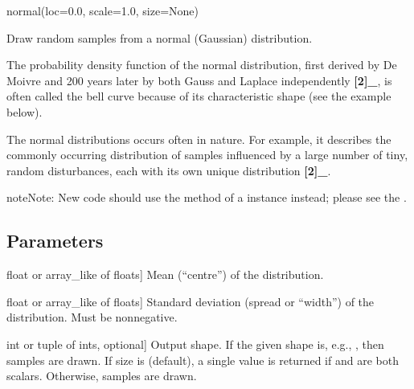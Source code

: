 \documentclass[letterpaper,10pt,english]{sphinxmanual}
\begin{document}
\begin{fulllineitems}
\label{\detokenize{myfpga:myfpga.ring_osc.np_normal}}
\pysigstartsignatures
{}
\pysigstopsignatures
\sphinxAtStartPar
normal(loc=0.0, scale=1.0, size=None)

\sphinxAtStartPar
Draw random samples from a normal (Gaussian) distribution.

\sphinxAtStartPar
The probability density function of the normal distribution, first
derived by De Moivre and 200 years later by both Gauss and Laplace
independently {\color{red}\bfseries{}{[}2{]}\_}, is often called the bell curve because of
its characteristic shape (see the example below).

\sphinxAtStartPar
The normal distributions occurs often in nature.  For example, it
describes the commonly occurring distribution of samples influenced
by a large number of tiny, random disturbances, each with its own
unique distribution {\color{red}\bfseries{}{[}2{]}\_}.

\begin{sphinxadmonition}{note}{Note:}
\sphinxAtStartPar
New code should use the 
method of a  instance instead;
please see the .
\end{sphinxadmonition}


\subsection{Parameters}
\label{\detokenize{myfpga:parameters}}\begin{description}
\sphinxlineitem{loc}{[}float or array\_like of floats{]}
\sphinxAtStartPar
Mean (“centre”) of the distribution.

\sphinxlineitem{scale}{[}float or array\_like of floats{]}
\sphinxAtStartPar
Standard deviation (spread or “width”) of the distribution. Must be
non\sphinxhyphen{}negative.

\sphinxlineitem{size}{[}int or tuple of ints, optional{]}
\sphinxAtStartPar
Output shape.  If the given shape is, e.g., , then
 samples are drawn.  If size is  (default),
a single value is returned if  and  are both scalars.
Otherwise,  samples are drawn.


\end{description}
\end{fulllineitems}
\end{document}
